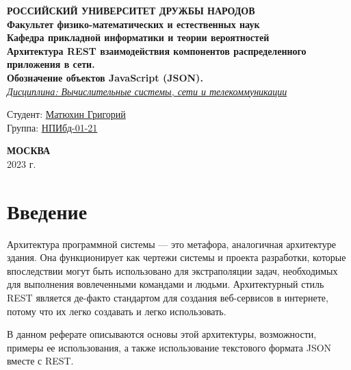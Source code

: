 \documentclass[a4page]{article}
\begin{document}
\begin{titlepage}
	\begin{center}
		\hfill \break
		\textbf{
			\large{РОССИЙСКИЙ УНИВЕРСИТЕТ ДРУЖБЫ НАРОДОВ}\\
			\normalsize{Факультет физико-математических и естественных наук}\\
			\normalsize{Кафедра прикладной информатики и теории вероятностей}\\
		}
		\vspace*{\fill}
		\Large{\textbf{Архитектура REST взаимодействия компонентов распределенного приложения в сети.\\Обозначение объектов JavaScript (JSON).}}
		\\
		\underline{\textit{\normalsize{Дисциплина: Вычислительные системы, сети и телекоммуникации}}}
		\vspace*{\fill}

	\end{center}

	\begin{flushright}
		Студент: \underline{Матюхин Григорий}\\ \vspace{0.5cm}
		Группа: \underline{НПИбд-01-21}
	\end{flushright}

	\begin{center} \textbf{МОСКВА} \\ 2023 г. \end{center}
	\thispagestyle{empty}

\end{titlepage}

\newpage

\tableofcontents

\newpage
\section{Введение}
Архитектура программной системы --- это метафора, аналогичная архитектуре здания.
Она функционирует как чертежи системы и проекта разработки,
которые впоследствии могут быть использовано для экстраполяции задач,
необходимых для выполнения вовлеченными командами и людьми.
Архитектурный стиль REST является де-факто стандартом для создания веб-сервисов в интернете,
потому что их легко создавать и легко использовать.

В данном реферате описываются основы этой архитектуры, возможности, примеры ее использования,
а также использование текстового формата JSON вместе с REST.
\end{document}
